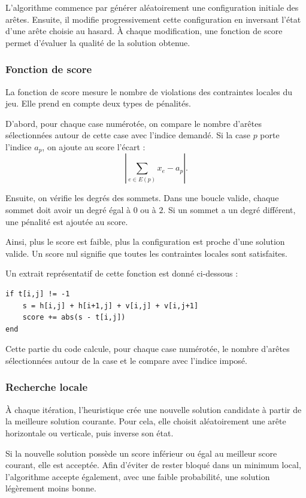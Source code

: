 L'algorithme commence par générer aléatoirement une configuration initiale des arêtes. Ensuite, il modifie progressivement cette configuration en inversant l'état d'une arête choisie au hasard. À chaque modification, une fonction de score permet d'évaluer la qualité de la solution obtenue.

\subsubsection{Fonction de score}

La fonction de score mesure le nombre de violations des contraintes locales du jeu. Elle prend en compte deux types de pénalités.

D'abord, pour chaque case numérotée, on compare le nombre d'arêtes sélectionnées autour de cette case avec l'indice demandé. Si la case \(p\) porte l'indice \(a_p\), on ajoute au score l'écart :
\[
\left| \sum_{e \in E(p)} x_e - a_p \right|.
\]

Ensuite, on vérifie les degrés des sommets. Dans une boucle valide, chaque sommet doit avoir un degré égal à \(0\) ou à \(2\). Si un sommet a un degré différent, une pénalité est ajoutée au score.

Ainsi, plus le score est faible, plus la configuration est proche d'une solution valide. Un score nul signifie que toutes les contraintes locales sont satisfaites.

Un extrait représentatif de cette fonction est donné ci-dessous :
\begin{verbatim}
if t[i,j] != -1
    s = h[i,j] + h[i+1,j] + v[i,j] + v[i,j+1]
    score += abs(s - t[i,j])
end
\end{verbatim}

Cette partie du code calcule, pour chaque case numérotée, le nombre d'arêtes sélectionnées autour de la case et le compare avec l'indice imposé.

\subsubsection{Recherche locale}

À chaque itération, l'heuristique crée une nouvelle solution candidate à partir de la meilleure solution courante. Pour cela, elle choisit aléatoirement une arête horizontale ou verticale, puis inverse son état.

Si la nouvelle solution possède un score inférieur ou égal au meilleur score courant, elle est acceptée. Afin d'éviter de rester bloqué dans un minimum local, l'algorithme accepte également, avec une faible probabilité, une solution légèrement moins bonne.

